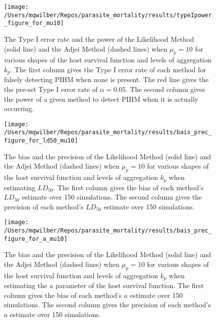\documentclass[12pt, a4paper]{article}
\begin{document}
\begin{figure}

    \texttt{[image: /Users/mqwilber/Repos/parasite\_mortality/results/typeIpower\_figure\_for\_mu10]}

    \caption{The Type I error rate and the power of the Likelihood Method (solid line) and the Adjei Method (dashed lines) when $\mu_p = 10$ for various shapes of the host survival function and levels of aggregation $k_p$.  The first column gives the Type I error rate of each method for falsely detecting PIHM when none is present.  The red line gives the the pre-set Type I error rate of $\alpha = 0.05$.  The second column gives the power of a given method to detect PIHM when it is actually occurring. }
    \label{fig:typeI10}

\end{figure}


\begin{figure}

    \texttt{[image: /Users/mqwilber/Repos/parasite\_mortality/results/bais\_prec\_figure\_for\_ld50\_mu10]}

    \caption{The bias and the precision of the Likelihood Method (solid line) and the Adjei Method (dashed lines) when $\mu_p = 10$ for various shapes of the host survival function and levels of aggregation $k_p$ when estimating $LD_{50}$.  The first column gives the bias of each method's $LD_{50}$ estimate over 150 simulations. The second column gives the precision of each method's $LD_{50}$ estimate over 150 simulations.}

    \label{fig:biasld50}

\end{figure}

\begin{figure}

    \texttt{[image: /Users/mqwilber/Repos/parasite\_mortality/results/bais\_prec\_figure\_for\_a\_mu10]}

    \caption{The bias and the precision of the Likelihood Method (solid line) and the Adjei Method (dashed lines) when $\mu_p = 10$ for various shapes of the host survival function and levels of aggregation $k_p$ when estimating the $a$ parameter of the host survival function.  The first column gives the bias of each method's $a$ estimate over 150 simulations. The second column gives the precision of each method's $a$ estimate over 150 simulations.}

    \label{fig:biasa}

\end{figure}
\end{document}
